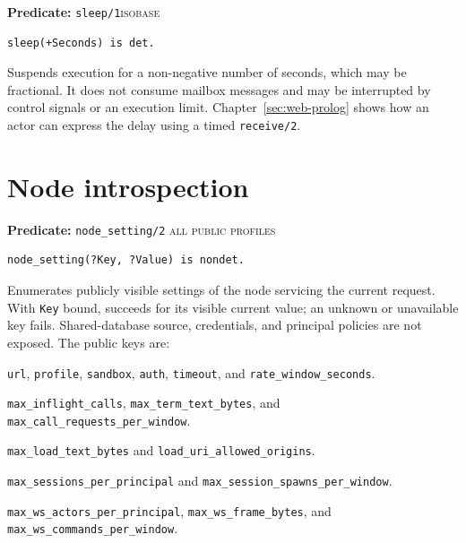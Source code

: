 \noindent \textbf{Predicate:} \texttt{sleep/\allowbreak{}1}\hfill\textsc{isobase}
\begin{verbatim}
sleep(+Seconds) is det.
\end{verbatim}
\noindent Suspends execution for a non-negative number of seconds,
which may be fractional. It does not consume mailbox messages and may be
interrupted by control signals or an execution limit. Chapter~\ref{sec:web-prolog}
shows how an actor can express the delay using a timed \texttt{receive/\allowbreak{}2}.

\section{Node introspection}\label{sec:manual-node-introspection}

\noindent \textbf{Predicate:} \texttt{node\_\allowbreak{}setting/\allowbreak{}2}
\hfill\textsc{all public profiles}

\begin{verbatim}
node_setting(?Key, ?Value) is nondet.
\end{verbatim}

\noindent Enumerates publicly visible settings of the node servicing the
current request. With \texttt{Key} bound, succeeds for its visible current
value; an unknown or unavailable key fails. Shared-database source,
credentials, and principal policies are not exposed. The public keys are:

\begin{description}
\raggedright
\item[General settings:] \texttt{url}, \texttt{profile}, \texttt{sandbox},
  \texttt{auth}, \texttt{timeout}, and \texttt{rate\_\allowbreak{}window\_\allowbreak{}seconds}.
\item[Stateless API:] \texttt{max\_\allowbreak{}inflight\_\allowbreak{}calls},
  \texttt{max\_\allowbreak{}term\_\allowbreak{}text\_\allowbreak{}bytes}, and
  \texttt{max\_\allowbreak{}call\_\allowbreak{}requests\_\allowbreak{}per\_\allowbreak{}window}.
\item[Private database:] \texttt{max\_\allowbreak{}load\_\allowbreak{}text\_\allowbreak{}bytes} and
  \texttt{load\_\allowbreak{}uri\_\allowbreak{}allowed\_\allowbreak{}origins}.
\item[Session API:] \texttt{max\_\allowbreak{}sessions\_\allowbreak{}per\_\allowbreak{}principal} and
  \texttt{max\_\allowbreak{}session\_\allowbreak{}spawns\_\allowbreak{}per\_\allowbreak{}window}.
\item[Actor API:] \texttt{max\_\allowbreak{}ws\_\allowbreak{}actors\_\allowbreak{}per\_\allowbreak{}principal},
  \texttt{max\_\allowbreak{}ws\_\allowbreak{}frame\_\allowbreak{}bytes}, and
  \texttt{max\_\allowbreak{}ws\_\allowbreak{}commands\_\allowbreak{}per\_\allowbreak{}window}.
\end{description}

